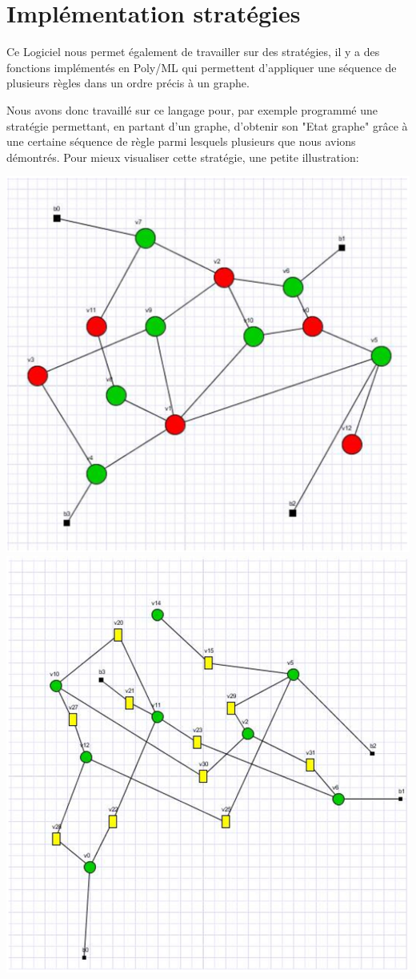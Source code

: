 \documentclass[a4paper,oneside]{book}
\begin{document}
\section{Implémentation stratégies}
Ce Logiciel nous permet également de travailler sur des stratégies, il y a des fonctions implémentés en Poly/ML qui permettent d'appliquer une séquence de plusieurs règles dans un ordre précis à un graphe.

Nous avons donc travaillé sur ce langage pour, par exemple programmé une stratégie permettant, en partant d'un graphe, d'obtenir son "Etat graphe" grâce à une certaine séquence de règle parmi lesquels plusieurs que nous avions démontrés. Pour mieux visualiser cette stratégie, une petite illustration:

\begin{center}
\includegraphics[scale=0.4]{IMG/strat1.eps}
\includegraphics[scale=0.4]{IMG/strat2.eps}

\end{center}
\end{document}
